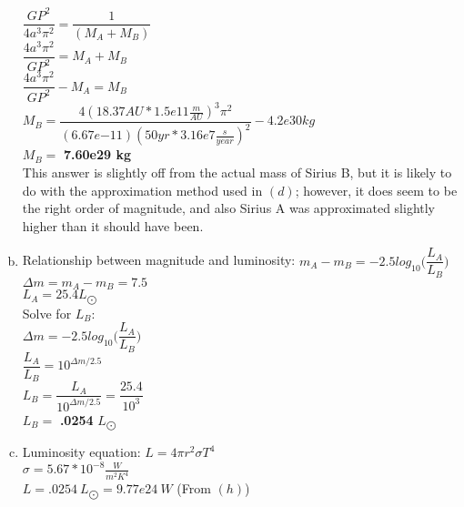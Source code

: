 \documentclass{article}
\begin{document}
\begin{adjustwidth}{.6cm}{}
\begin{enumerate}[a)]
            $\dfrac{GP^2}{4a^3{\pi}^2} = \dfrac{1}{(M_A + M_B)}$\\

            $\dfrac{4a^3{\pi}^2}{GP^2} = M_A + M_B$\\

            $\dfrac{4a^3{\pi}^2}{GP^2}-M_A = M_B$\\

            $M_B = \dfrac{4(18.37AU*1.5e11\frac{m}{AU})^3{\pi}^2}{(6.67e{-11})(50yr*3.16e7\frac{s}{year})^2}-4.2e30kg$\\

            $M_B = $ \textbf{7.60e29 kg}\\

            This answer is slightly off from the actual mass of Sirius B, but it is likely to do with the approximation method used in $(d)$; however, it does seem to be the right order of magnitude, and also Sirius A was approximated slightly higher than it should have been.
            \clearpage
            \item
            Relationship between magnitude and luminosity: $m_A - m_B = -2.5log_{10}\Bigg(\dfrac{L_A}{L_B}\Bigg)$\\
            $\Delta{m} = m_A - m_B = 7.5$\\

            $L_A = 25.4L_{\bigodot}$\\

            Solve for $L_B$:\\

            $\Delta{m} = -2.5log_{10}\Bigg(\dfrac{L_A}{L_B}\Bigg)$\\

            $\dfrac{L_A}{L_B} = 10^{\Delta{m}/2.5}$\\

            $L_B = \dfrac{L_A}{10^{\Delta{m}/2.5}} = \dfrac{25.4}{10^{3}}$\\

            $L_B = $ \textbf{.0254} $L_{\bigodot}$

            \item
            Luminosity equation: $L = 4{\pi}r^2{\sigma}T^4$\\

            $\sigma = 5.67*10^{-8}\frac{W}{m^2K^4}$\\

            $L = .0254\:L_{\bigodot} = 9.77e24\:W$ (From $(h)$)\\


\end{enumerate}
\end{adjustwidth}
\end{document}
